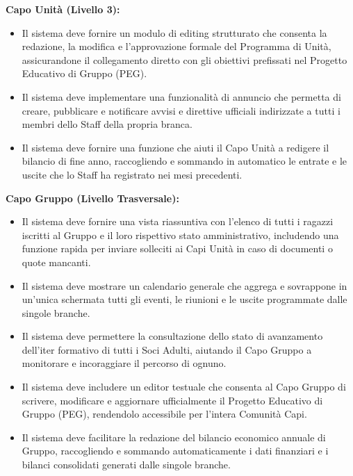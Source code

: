 \documentclass[11pt]{article}
\numberwithin{figure}{section}
\begin{document}
\textbf{Capo Unità (Livello 3):}
\begin{itemize}[topsep=0pt]
    \item Il sistema deve fornire un modulo di editing strutturato che consenta la redazione, la modifica e l'approvazione formale del Programma di Unità, assicurandone il collegamento diretto con gli obiettivi prefissati nel Progetto Educativo di Gruppo (PEG).
    \item Il sistema deve implementare una funzionalità di annuncio che permetta di creare, pubblicare e notificare avvisi e direttive ufficiali indirizzate a tutti i membri dello Staff della propria branca. 
    \item Il sistema deve fornire una funzione che aiuti il Capo Unità a redigere il bilancio di fine anno, raccogliendo e sommando in automatico le entrate e le uscite che lo Staff ha registrato nei mesi precedenti.
\end{itemize}

\newpage

\textbf{Capo Gruppo (Livello Trasversale):}
\begin{itemize}[topsep=0pt]
    \item Il sistema deve fornire una vista riassuntiva con l'elenco di tutti i ragazzi iscritti al Gruppo e il loro rispettivo stato amministrativo, includendo una funzione rapida per inviare solleciti ai Capi Unità in caso di documenti o quote mancanti.
    \item Il sistema deve mostrare un calendario generale che aggrega e sovrappone in un'unica schermata tutti gli eventi, le riunioni e le uscite programmate dalle singole branche.
    \item Il sistema deve permettere la consultazione dello stato di avanzamento dell'iter formativo di tutti i Soci Adulti, aiutando il Capo Gruppo a monitorare e incoraggiare il percorso di ognuno.
    \item Il sistema deve includere un editor testuale che consenta al Capo Gruppo di scrivere, modificare e aggiornare ufficialmente il Progetto Educativo di Gruppo (PEG), rendendolo accessibile per l'intera Comunità Capi.
    \item Il sistema deve facilitare la redazione del bilancio economico annuale di Gruppo, raccogliendo e sommando automaticamente i dati finanziari e i bilanci consolidati generati dalle singole branche.
\end{itemize}

\vspace{1cm}
\end{document}
